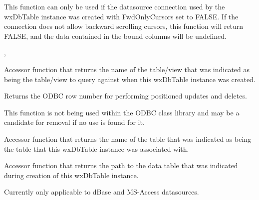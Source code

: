 
This function can only be used if the datasource connection used by the 
wxDbTable instance was created with FwdOnlyCursors set to FALSE.  If the 
connection does not allow backward scrolling cursors, this function will 
return FALSE, and the data contained in the bound columns will be undefined.


, 


\label{wxdbtablegetquerytablename}


Accessor function that returns the name of the table/view that was indicated 
as being the table/view to query against when this wxDbTable instance was 
created.




\label{wxdbtablegetrownum}


Returns the ODBC row number for performing positioned updates and deletes.  


This function is not being used within the ODBC class library and may be a 
candidate for removal if no use is found for it.


\label{wxdbtablegettablename}


Accessor function that returns the name of the table that was indicated 
as being the table that this wxDbTable instance was associated with.


\label{wxdbtablegettablepath}


Accessor function that returns the path to the data table that was indicated 
during creation of this wxDbTable instance.


Currently only applicable to dBase and MS-Access datasources.


\label{wxdbtablegetwhereclause}

